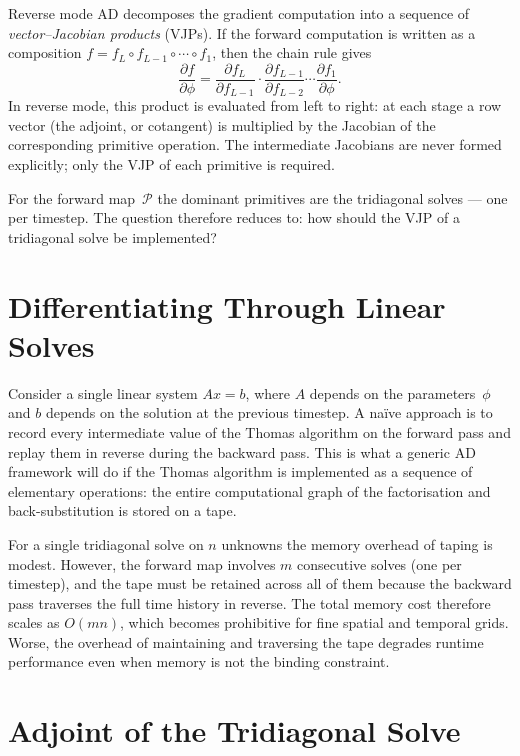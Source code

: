 Reverse mode AD decomposes the gradient computation into a sequence of
\emph{vector--Jacobian products} (VJPs). If the forward computation is
written as a composition $f = f_L \circ f_{L-1} \circ \cdots \circ f_1$,
then the chain rule gives
\begin{equation}
  \frac{\partial f}{\partial \phi}
  = \frac{\partial f_L}{\partial f_{L-1}}
  \cdot \frac{\partial f_{L-1}}{\partial f_{L-2}}
  \cdots
  \frac{\partial f_1}{\partial \phi}.
  \label{eq:chain-rule}
\end{equation}
In reverse mode, this product is evaluated from left to right: at each
stage a row vector (the adjoint, or cotangent) is multiplied by the
Jacobian of the corresponding primitive operation. The intermediate
Jacobians are never formed explicitly; only the VJP of each primitive is
required.

For the forward map~$\mathcal{P}$ the dominant primitives are the
tridiagonal solves --- one per timestep. The question therefore reduces
to: how should the VJP of a tridiagonal solve be implemented?

\section{Differentiating Through Linear Solves}\label{sec:diff-linear}

Consider a single linear system $A x = b$, where $A$ depends on the
parameters~$\phi$ and
$b$ depends on the solution at the previous timestep. A na\"ive approach
is to record every intermediate value of the Thomas algorithm on the
forward pass and replay them in reverse during the backward pass. This is
what a generic AD framework will do if the Thomas algorithm is
implemented as a sequence of elementary operations: the entire
computational graph of the factorisation and back-substitution is stored
on a tape.

For a single tridiagonal solve on $n$ unknowns the memory overhead of
taping is modest. However, the forward map involves $m$ consecutive
solves (one per timestep), and the tape must be retained across all of
them because the backward pass traverses the full time history in
reverse. The total memory cost therefore scales as $O(mn)$, which becomes
prohibitive for fine spatial and temporal grids. Worse, the overhead of
maintaining and traversing the tape degrades runtime performance even when
memory is not the binding constraint.

\section{Adjoint of the Tridiagonal Solve}\label{sec:adjoint-solve}

